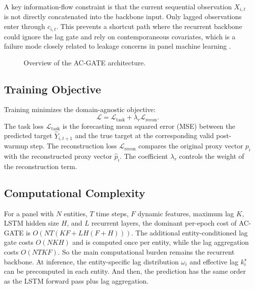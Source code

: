 \documentclass[conference]{IEEEtran}
\begin{document}
A key information-flow constraint is that the current sequential observation $X_{i,t}$ is not directly concatenated into the backbone input. Only lagged observations enter through $c_{i,t}$. This prevents a shortcut path where the recurrent backbone could ignore the lag gate and rely on contemporaneous covariates, which is a failure mode closely related to leakage concerns in panel machine learning \cite{cerqua2025mlpanel}.

\begin{figure}[!tbhp]
    \centering
    
    \caption{Overview of the AC-GATE architecture.}
    \label{fig:ac_gate_arch}
\end{figure}

\subsection{Training Objective}
Training minimizes the domain-agnostic objective:
\begin{equation}
    \mathcal{L}
    =
    \mathcal{L}_{\mathrm{task}}
    +
    \lambda_r \mathcal{L}_{\mathrm{recon}}.
\end{equation}
The task loss $\mathcal{L}_{\mathrm{task}}$ is the forecasting mean squared error (MSE) between the predicted target $\widehat{Y}_{i,t+1}$ and the true target at the corresponding valid post-warmup step. The reconstruction loss $\mathcal{L}_{\mathrm{recon}}$ compares the original proxy vector $p_i$ with the reconstructed proxy vector $\widehat{p}_i$. The coefficient $\lambda_r$ controls the weight of the reconstruction term. 


\subsection{Computational Complexity}
For a panel with $N$ entities, $T$ time steps, $F$ dynamic features, maximum lag $K$, LSTM hidden size $H$, and $L$ recurrent layers, the dominant per-epoch cost of AC-GATE is $O(NT(KF + LH(F+H)))$. The additional entity-conditioned lag gate costs $O(NKH)$ and is computed once per entity, while the lag aggregation costs $O(NTKF)$. So the main computational burden remains the recurrent backbone. At inference, the entity-specific lag distribution $\omega_i$ and effective lag $k_i^\star$ can be precomputed in each entity. And then, the prediction has the same order as the LSTM forward pass plus lag aggregation.
\end{document}
